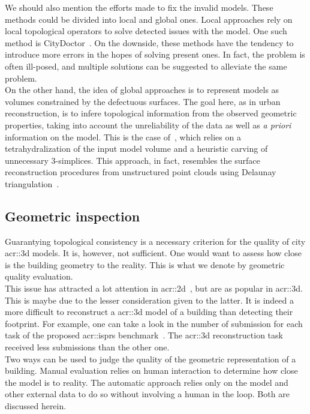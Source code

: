         We should also mention the efforts made to fix the invalid models. 
        These methods could be divided into local and global ones.
        Local approaches rely on local topological operators to solve detected issues with the model.
        One such method is CityDoctor~\parencite{alam2014towards}.
        On the downside, these methods have the tendency to introduce more errors in the hopes of solving present ones.
        In fact, the problem is often ill-posed, and multiple solutions can be suggested to alleviate the same problem.\\
        On the other hand, the idea of global approaches is to represent models as volumes constrained by the defectuous surfaces.
        The goal here, as in urban reconstruction, is to infere topological information from the observed geometric properties, taking into account the unreliability of the data as well as \textit{a priori} information on the model.
        This is the case of~\textcite{zhao2013automatic}, which relies on a tetrahydralization of the input model volume and a heuristic carving of unnecessary 3-simplices.
        This approach, in fact, resembles the surface reconstruction procedures from unstructured point clouds using Delaunay triangulation~\parencite{cazals2006delaunay, berger2014state}.

    \subsection{Geometric inspection}
        \label{subsec::introduction::building_model_evaluation::geometric}
        Guarantying topological consistency is a necessary criterion for the quality of city \gls{acr::3d} models.
        It is, however, not sufficient.
        One would want to assess how close is the building geometry to the reality.
        This is what we denote by geometric quality evaluation.\\
        This issue has attracted a lot attention in \gls{acr::2d}~\parencite{mooney2010towards}, but are as popular in \gls{acr::3d}.
        This is maybe due to the lesser consideration given to the latter.
        It is indeed a more difficult to reconstruct a \gls{acr::3d} model of a building than detecting their footprint.
        For example, one can take a look in the number of submission for each task of the proposed \gls{acr::isprs} benchmark~\textcite{rottensteiner2012isprs, rottensteiner2014results}.
        The \gls{acr::3d} reconstruction task received less submissions than the other one.\\
        Two ways can be used to judge the quality of the geometric representation of a building.
        Manual evaluation relies on human interaction to determine how close the model is to reality.
        The automatic approach relies only on the model and other external data to do so without involving a human in the loop.
        Both are discussed herein.

